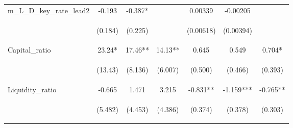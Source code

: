 \documentclass[]{article}
\begin{document}
\begin{center}
\begin{tabular}{lcccccc}
m\_L\_D\_key\_rate\_lead2 & -0.193 & -0.387* &  & 0.00339 & -0.00205 &  \\
\vspace{4pt} & \begin{footnotesize}(0.184)\end{footnotesize} & \begin{footnotesize}(0.225)\end{footnotesize} & \begin{footnotesize}\end{footnotesize} & \begin{footnotesize}(0.00618)\end{footnotesize} & \begin{footnotesize}(0.00394)\end{footnotesize} & \begin{footnotesize}\end{footnotesize} \\
Capital\_ratio & 23.24* & 17.46** & 14.13** & 0.645 & 0.549 & 0.704* \\
\vspace{4pt} & \begin{footnotesize}(13.43)\end{footnotesize} & \begin{footnotesize}(8.136)\end{footnotesize} & \begin{footnotesize}(6.007)\end{footnotesize} & \begin{footnotesize}(0.500)\end{footnotesize} & \begin{footnotesize}(0.466)\end{footnotesize} & \begin{footnotesize}(0.393)\end{footnotesize} \\
Liquidity\_ratio & -0.665 & 1.471 & 3.215 & -0.831** & -1.159*** & -0.765** \\
\vspace{4pt} & \begin{footnotesize}(5.482)\end{footnotesize} & \begin{footnotesize}(4.453)\end{footnotesize} & \begin{footnotesize}(4.386)\end{footnotesize} & \begin{footnotesize}(0.374)\end{footnotesize} & \begin{footnotesize}(0.378)\end{footnotesize} & \begin{footnotesize}(0.303)\end{footnotesize} \\

\end{tabular}
\end{center}
\end{document}
